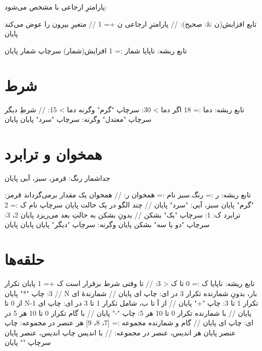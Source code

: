 پارامترِ ارجاعی با \code{\&} مشخص می‌شود:

\begin{salamfa}
تابع افزایش(ن &: صحیح):          // پارامترِ ارجاعی
    ن += 1                       // متغیرِ بیرون را عوض می‌کند
پایان

تابع ریشه:
    ناپایا شمار := 1
    افزایش(شمار)
    سرچاپ شمار
پایان
\end{salamfa}

\section{شرط}

\begin{salamfa}
تابع ریشه:
    دما := 18
    اگر دما > 30:
        سرچاپ "گرم"
    وگرنه دما > 15:              // شرطِ دیگر
        سرچاپ "معتدل"
    وگرنه:
        سرچاپ "سرد"
    پایان
پایان
\end{salamfa}

\section{همخوان و ترابرد}

\begin{salamfa}
جداشمار رنگ: قرمز، سبز، آبی پایان

تابع ریشه:
    ر := رنگ.سبز
    نام := همخوان ر:                     // همخوان یک مقدار برمی‌گرداند
        قرمز: "گرم" پایان
        سبز، آبی: "سرد" پایان            // چند الگو در یک حالت
    پایان
    سرچاپ نام
    ک := 2
    ترابرد ک:
        1:
            سرچاپ "یک"
            بشکن                         // بدونِ بشکن به حالتِ بعد می‌ریزد
        پایان
        2، 3:
            سرچاپ "دو یا سه"
            بشکن
        پایان
        وگرنه:
            سرچاپ "دیگر"
        پایان
    پایان
پایان
\end{salamfa}

\section{حلقه‌ها}

\begin{salamfa}
تابع ریشه:
    ناپایا ک := 0
    تا ک < 3:                      // تا وقتی شرط برقرار است
        ک += 1
    پایان
    تکرار 3:  چاپ "*"  پایان               // N بار، بدونِ شمارنده
    تکرار 3 در ای:  چاپ ای  پایان          // شمارندهٔ ای از 0 تا N-1
    تکرار 1 تا 3:  چاپ "+"  پایان          // از آ تا ب، شامل
    تکرار 1 تا 3 در ای:  چاپ ای  پایان     // با شمارنده
    تکرار 0 تا 10 هر 5:  چاپ "-"  پایان    // با گام
    تکرار 0 تا 10 هر 5 در ای:  چاپ ای  پایان   // گام و شمارنده
    مجموعه := [7، 8، 9]
    هر عنصر در مجموعه:
        چاپ عنصر
    پایان
    هر اندیس، عنصر در مجموعه:       // با اندیس
        چاپ اندیس، عنصر
    پایان
    سرچاپ ""
پایان
\end{salamfa}

